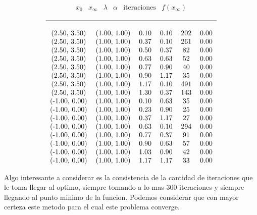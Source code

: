 \documentclass[letterpaper]{article}
\begin{document}
\[ \begin{matrix}
    x_{0} & x_{\infty} & \lambda & \alpha & \text{iteraciones} & f(x_{\infty}) \\
  \end{matrix}
\]
\[
\begin{tabular}{c c c c c c}
  \hline \\
(2.50, 3.50)  & (1.00, 1.00) & 0.10 & 0.10 & 202 & 0.00 \\
(2.50, 3.50)  & (1.00, 1.00) & 0.37 & 0.10 & 261 & 0.00 \\
(2.50, 3.50)  & (1.00, 1.00) & 0.50 & 0.37 & 82  & 0.00 \\
(2.50, 3.50)  & (1.00, 1.00) & 0.63 & 0.63 & 52  & 0.00 \\
(2.50, 3.50)  & (1.00, 1.00) & 0.77 & 0.90 & 40  & 0.00 \\
(2.50, 3.50)  & (1.00, 1.00) & 0.90 & 1.17 & 35  & 0.00 \\
(2.50, 3.50)  & (1.00, 1.00) & 1.17 & 0.10 & 491 & 0.00 \\
(2.50, 3.50)  & (1.00, 1.00) & 1.30 & 0.37 & 143 & 0.00 \\
(-1.00, 0.00) & (1.00, 1.00) & 0.10 & 0.63 & 35  & 0.00 \\
(-1.00, 0.00) & (1.00, 1.00) & 0.23 & 0.90 & 25  & 0.00 \\
(-1.00, 0.00) & (1.00, 1.00) & 0.37 & 1.17 & 27  & 0.00 \\
(-1.00, 0.00) & (1.00, 1.00) & 0.63 & 0.10 & 294 & 0.00 \\
(-1.00, 0.00) & (1.00, 1.00) & 0.77 & 0.37 & 91  & 0.00 \\
(-1.00, 0.00) & (1.00, 1.00) & 0.90 & 0.63 & 57  & 0.00 \\
(-1.00, 0.00) & (1.00, 1.00) & 1.03 & 0.90 & 42  & 0.00 \\
(-1.00, 0.00) & (1.00, 1.00) & 1.17 & 1.17 & 33  & 0.00 \\
\end{tabular}
\]

Algo interesante a considerar es la consistencia de la cantidad de
iteraciones que le toma llegar al optimo, siempre tomando a lo mas 300
iteraciones y siempre llegando al punto minimo de la funcion. Podemos
considerar que con mayor certeza este metodo para el cual este problema
converge.
\end{document}
